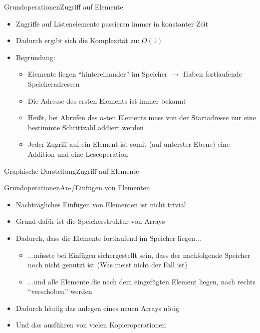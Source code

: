 \begin{frame}{Grundoperationen}{Zugriff auf Elemente}
	\begin{itemize}
		\item Zugriffe auf Listenelemente passieren immer in konstanter Zeit
		\item Dadurch ergibt sich die Komplexität zu: $O(1)$
		\item Begründung:
		\begin{itemize}
			\item Elemente liegen "`hintereinander"' im Speicher $\rightarrow$ Haben fortlaufende Speicheradressen
			\item Die Adresse des ersten Elements ist immer bekannt
			\item Heißt, bei Abrufen des $n$-ten Elements muss von der Startadresse nur eine bestimmte Schrittzahl addiert werden
			\item Jeder Zugriff auf ein Element ist somit (auf unterster Ebene) eine Addition und eine Leseoperation
		\end{itemize}
	\end{itemize}
\end{frame}


\begin{frame}{Graphische Darstellung}{Zugriff auf Elemente}
\end{frame}

\begin{frame}{Grundoperationen}{An-/Einfügen von Elementen}
	\begin{itemize}
		\item Nachträgliches Einfügen von Elementen ist nicht trivial
		\item Grund dafür ist die Speicherstruktur von Arrays
		\item Dadurch, dass die Elemente fortlaufend im Speicher liegen...
		\begin{itemize}
			\item ...müsste bei Einfügen sichergestellt sein, dass der nachfolgende Speicher noch nicht genutzt ist (Was meist nicht der Fall ist)
			\item ...und alle Elemente die nach dem eingefügten Element liegen, nach rechts "`verschoben"' werden
		\end{itemize}
		\item Dadurch häufig das anlegen eines neuen Arrays nötig
		\item Und das ausführen von vielen Kopieroperationen
	\end{itemize}
\end{frame}

